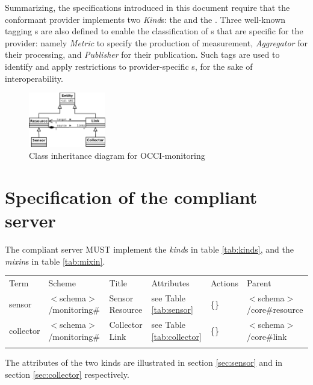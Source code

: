 \documentclass[10pt,a4paper]{article}
\begin{document}
Summarizing, the specifications introduced in this document require that the conformant provider implements two {\em Kind}s: the {\em \coll } and the {\em \sens }. Three well-known tagging \mi s are also defined to enable the classification of \mi s that are specific for the provider: namely {\em Metric} to specify the production of measurement, {\em Aggregator} for their processing, and {\em Publisher} for their publication. Such tags are used to identify and apply restrictions to provider-specific \mi s, for the sake of interoperability.

\begin{figure}
\centering
\includegraphics[width=0.3\textwidth]{figs/Monitoring_UML.pdf}
\caption{Class inheritance diagram for OCCI-monitoring}
\end{figure}

\section{Specification of the compliant server}

The compliant server MUST implement the {\em kind}s in table \ref{tab:kinds}, and the {\em mixin}s in table \ref{tab:mixin}.

 {
        \begin{tabular}{llllll}
        \toprule
        Term & Scheme & Title & Attributes & Actions & Parent\\
        \colrule
        sensor &  $<$schema$>$/monitoring\# & Sensor Resource
        & see Table \ref{tab:sensor} & \{\} &  $<$schema$>$/core\#resource\\
        collector &  $<$schema$>$/monitoring\# & Collector Link
        & see Table \ref{tab:collector} & \{\} & $<$schema$>$/core\#link \\
        \botrule
        \end{tabular}
}

The attributes of the two kinds are illustrated in section \ref{sec:sensor} and in section \ref{sec:collector} respectively.
\end{document}
